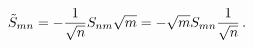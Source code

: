 \begin{equation}
\tilde{S}_{mn}=-{\frac{1}{\sqrt{n}}}S_{nm}\sqrt{m}=-\sqrt{m}S_{mn}{\frac{1}{%
\sqrt{n}}}\,.
\end{equation}

